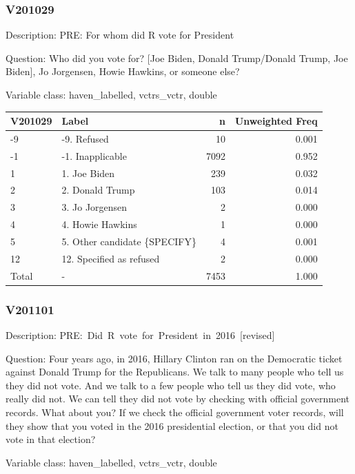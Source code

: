 \documentclass[
]{krantz}
\begin{document}
\hypertarget{v201029}{%
\subsubsection*{V201029}\label{v201029}}


Description: PRE: For whom did R vote for President

Question: Who did you vote for? {[}Joe Biden, Donald Trump/Donald Trump, Joe Biden{]}, Jo Jorgensen, Howie Hawkins, or someone else?

Variable class: haven\_labelled, vctrs\_vctr, double

\begin{tabular}[t]{l|l|r|r}
\hline
V201029 & Label & n & Unweighted Freq\\
\hline
-9 & -9. Refused & 10 & 0.001\\
\hline
-1 & -1. Inapplicable & 7092 & 0.952\\
\hline
1 & 1. Joe Biden & 239 & 0.032\\
\hline
2 & 2. Donald Trump & 103 & 0.014\\
\hline
3 & 3. Jo Jorgensen & 2 & 0.000\\
\hline
4 & 4. Howie Hawkins & 1 & 0.000\\
\hline
5 & 5. Other candidate \{SPECIFY\} & 4 & 0.001\\
\hline
12 & 12. Specified as refused & 2 & 0.000\\
\hline
Total & - & 7453 & 1.000\\
\hline
\end{tabular}

\hypertarget{v201101}{%
\subsubsection*{V201101}\label{v201101}}


Description: PRE:~Did~R~vote~for~President~in~2016~{[}revised{]}

Question: Four years ago, in 2016, Hillary Clinton ran on the Democratic ticket against Donald Trump for the Republicans. We talk to many people who tell us they did not vote. And we talk to a few people who tell us they did vote, who really did not. We can tell they did not vote by checking with official government records. What about you? If we check the official government voter records, will they show that you voted in the 2016 presidential election, or that you did not vote in that election?

Variable class: haven\_labelled, vctrs\_vctr, double
\end{document}
